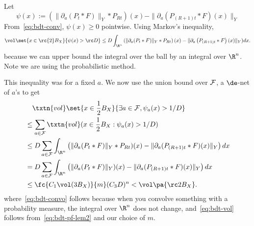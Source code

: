 Let 
\[
\psi(x):=\left(\|\partial_a(P_t*F)\|_Y * P_{Rt}\right)(x) - \|\partial_a\left(P_{(R + 1)t}*F\right)(x)\|_Y
\]
From~\eqref{eq:bdt-conv}, $\psi(x)\ge 0$ pointwise. 
Using Markov's inequality,
\[
\vol\set{x\in \rc{2}B_X}{\psi(x)>\rc D}\leq D\int_{\R^n} \left(\|\partial_a(P_t*F)\|_Y * P_{Rt}\right)(x) - \|\partial_a\left(P_{(R + 1)t}*F\right)(x)\|_Y ) dx.
\]
because we can upper bound the integral over the ball by an integral over $\R^n$. 
Note we are using the probabilistic method. %

This inequality was for a fixed $a$. We now use the union bound over $\cal F$, a $\de$-net of $a$'s to get
\begin{align}
&\quad \txtn{vol}\set{x \in \frac{1}{2}B_X}{\exists a \in \mathcal{F}, \psi_a(x) > 1/D}\\ &\leq \sum_{a \in \mathcal{F}} \txtn{vol}(x \in \frac{1}{2}B_X: \psi_a(x) > 1/D)\\
&\leq D\sum_{a \in \mathcal{F}} \int_{\R^n}\left(\|\partial_a(P_t*F)\|_Y * P_{Rt})(x) - \|\partial_a(P_{(R + 1)t} * F)(x)\|_Y\right) dx\\
&=D\sum_{a \in \mathcal{F}} \int_{\R^n}\left(\|\partial_a(P_t*F)\|_Y)(x) - \|\partial_a(P_{(R + 1)t} * F)(x)\|_Y\right) dx \label{eq:bdt-convo}\\
&\le \fc{C_1\vol(3B_X)}{m} (C_3D)^n < \vol\pa{\rc2B_X}.\label{eq:bdt-vol}
\end{align}
where~\eqref{eq:bdt-convo} follows because when you convolve something with a probability measure, the integral over $\R^n$ does not change, and~\eqref{eq:bdt-vol} follows from~\eqref{eq:bdt-pf-lem2} and our choice of $m$.


